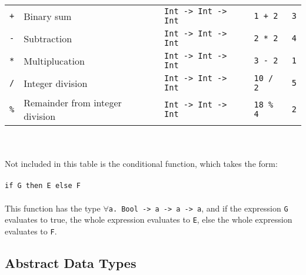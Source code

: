 \documentclass{article}
\begin{document}
{\begin{tabular}{ | p{13mm} | l | l | l | p{25mm} | }
    \texttt{+}      & Binary sum                        & \texttt{Int -> Int -> Int}            & \texttt{1 + 2}            & \texttt{3}                    \\
    \texttt{-}      & Subtraction                       & \texttt{Int -> Int -> Int}            & \texttt{2 * 2}            & \texttt{4}                    \\
    \texttt{*}      & Multiplucation                    & \texttt{Int -> Int -> Int}            & \texttt{3 - 2}            & \texttt{1}                    \\
    \texttt{/}      & Integer division                  & \texttt{Int -> Int -> Int}            & \texttt{10 / 2}           & \texttt{5}                    \\
    \texttt{\%}     & Remainder from integer division   & \texttt{Int -> Int -> Int}            & \texttt{18 \% 4}          & \texttt{2}                    \\
    \hline
\end{tabular}}
\\\\
Not included in this table is the conditional function, which takes the form:
\\\\
\indent \texttt{if G then E else F}
\\\\
This function has the type \texttt{$\forall$a. Bool -> a -> a -> a}, and if the expression \texttt{G} evaluates to true, the whole expression evaluates to \texttt{E}, else the whole expression evaluates to \texttt{F}.

\subsection{Abstract Data Types}
\end{document}
